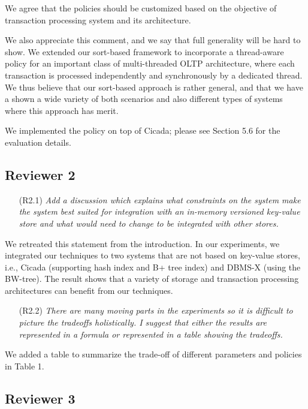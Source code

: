 \documentclass{article}
\newcommand{\todo}[1]{}
\newcommand{\changed}[1]{#1}
\newcommand{\todo}[1]{\textcolor{red}{\bf [TODO!: #1]}}
\newcommand{\changed}[1]{{\color{blue}#1}}
\begin{document}
\changed{
We agree that the policies should be customized based on the objective of transaction processing system and its architecture.

We also appreciate this comment, and we say that full generality will be hard to show. We extended our sort-based framework to incorporate a thread-aware policy for an important class of multi-threaded OLTP architecture, where each transaction is processed independently and synchronously by a dedicated thread. We thus believe that our sort-based approach is rather general, and that we have a shown a wide variety of both scenarios and also different types of systems where this approach has merit. 

We implemented the policy on top of Cicada; please see Section 5.6 for the evaluation details.
}

\subsection{Reviewer 2}

\begin{itemize}
\item[(R2.1)] \emph{Add a discussion which explains what constraints on the system make the system best suited for integration with an in-memory versioned key-value store and what would need to change to be integrated with other stores.}
\end{itemize}

\changed{
	We retreated this statement from the introduction. In our experiments, we integrated our techniques to two systems that are not based on key-value stores, i.e., Cicada (supporting hash index and B+ tree index) and DBMS-X (using the BW-tree). The result shows that a variety of storage and transaction processing architectures can benefit from our techniques.
}

\begin{itemize}
\item[(R2.2)] \emph{There are many moving parts in the experiments so it is difficult to picture the tradeoffs holistically. I suggest that either the results are represented in a formula or represented in a table showing the tradeoffs.}
\end{itemize}

\todo{Add to appendix}
\changed{
	We added a table to summarize the trade-off of different parameters and policies in Table 1.
}

\subsection{Reviewer 3}
\end{document}
